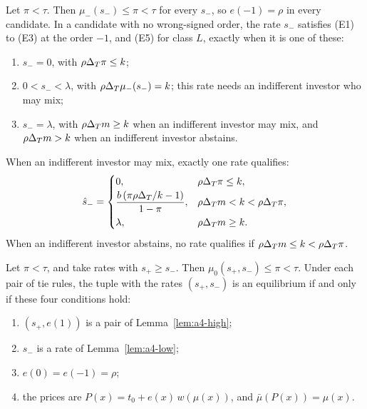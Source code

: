 \begin{lemma}\label{lem:a4-low}
Let \(\pi<\tau\). Then \(\mu_-(s_-)\le\pi<\tau\) for every \(s_-\), so \(e(-1)=\rho\) in every candidate. In a
candidate with no wrong-signed order, the rate \(s_-\) satisfies (E1) to (E3) at the order \(-1\), and (E5) for class
\(L\), exactly when it is one of these:
\begin{enumerate}[leftmargin=2.5em]
\item[(N)] \(s_-=0\), with \(\rho\Delta_T\pi\le k\);
\item[(Q)] \(0<s_-<\lambda\), with \(\rho\Delta_T\mu_-(s_-)=k\); this rate needs an indifferent investor who may mix;
\item[(F)] \(s_-=\lambda\), with \(\rho\Delta_T m\ge k\) when an indifferent investor may mix, and \(\rho\Delta_T m>k\) when an
indifferent investor abstains.
\end{enumerate}
When an indifferent investor may mix, exactly one rate qualifies:
\[
\hat s_-=\begin{cases}0, & \rho\Delta_T\pi\le k,\\[2pt]
\dfrac{b\,(\pi\rho\Delta_T/k-1)}{1-\pi}, & \rho\Delta_T m<k<\rho\Delta_T\pi,\\[6pt]
\lambda, & \rho\Delta_T m\ge k.\end{cases}
\]
When an indifferent investor abstains, no rate qualifies if \(\rho\Delta_T m\le k<\rho\Delta_T\pi\).
\end{lemma}

\begin{lemma}\label{lem:a4-product}
Let \(\pi<\tau\), and take rates with \(s_+\ge s_-\). Then \(\mu_0(s_+,s_-)\le\pi<\tau\). Under each pair of tie rules,
the tuple with the rates \((s_+,s_-)\) is an equilibrium if and only if these four conditions hold:
\begin{enumerate}[label=(\roman*),leftmargin=2.5em]
\item \((s_+,e(1))\) is a pair of Lemma~\ref{lem:a4-high};
\item \(s_-\) is a rate of Lemma~\ref{lem:a4-low};
\item \(e(0)=e(-1)=\rho\);
\item the prices are \(P(x)=t_0+e(x)\,w(\mu(x))\), and \(\bar\mu(P(x))=\mu(x)\).
\end{enumerate}
\end{lemma}

